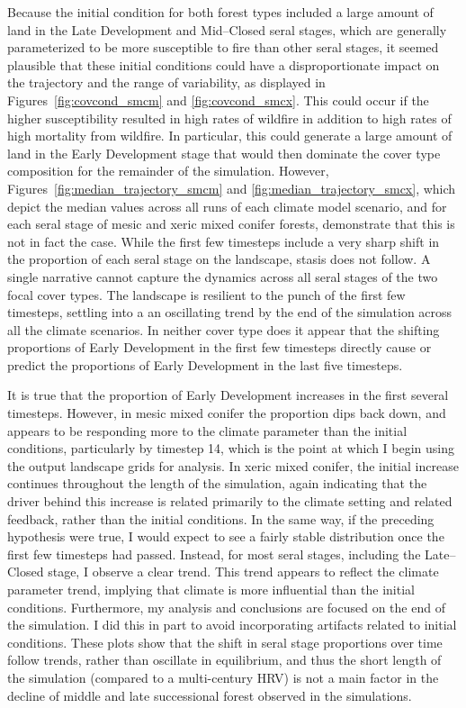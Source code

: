 Because the initial condition for both forest types included a large amount of land in the Late Development and Mid--Closed seral stages, which are generally parameterized to be more susceptible to fire than other seral stages, it seemed plausible that these initial conditions could have a disproportionate impact on the trajectory and the range of variability, as displayed in Figures~\ref{fig:covcond_smcm} and \ref{fig:covcond_smcx}. This could occur if the higher susceptibility resulted in high rates of wildfire in addition to high rates of high mortality from wildfire. In particular, this could generate a large amount of land in the Early Development stage that would then dominate the cover type composition for the remainder of the simulation. However, Figures~\ref{fig:median_trajectory_smcm} and \ref{fig:median_trajectory_smcx}, which depict the median values across all runs of each climate model scenario, and for each seral stage of mesic and xeric mixed conifer forests, demonstrate that this is not in fact the case. While the first few timesteps include a very sharp shift in the proportion of each seral stage on the landscape, stasis does not follow. A single narrative cannot capture the dynamics across all seral stages of the two focal cover types. The landscape is resilient to the punch of the first few timesteps, settling into a an oscillating trend by the end of the simulation across all the climate scenarios. In neither cover type does it appear that the shifting proportions of Early Development in the first few timesteps directly cause or predict the proportions of Early Development in the last five timesteps.

It is true that the proportion of Early Development increases in the first several timesteps. However, in mesic mixed conifer the proportion dips back down, and appears to be responding more to the climate parameter than the initial conditions, particularly by timestep 14, which is the point at which I begin using the output landscape grids for analysis. In xeric mixed conifer, the initial increase continues throughout the length of the simulation, again indicating that the driver behind this increase is related primarily to the climate setting and related feedback, rather than the initial conditions. In the same way, if the preceding hypothesis were true, I would expect to see a fairly stable distribution once the first few timesteps had passed. Instead, for most seral stages, including the Late--Closed stage, I observe a clear trend. This trend appears to reflect the climate parameter trend, implying that climate is more influential than the initial conditions. Furthermore, my analysis and conclusions are focused on the end of the simulation. I did this in part to avoid incorporating artifacts related to initial conditions. These plots show that the shift in seral stage proportions over time follow trends, rather than oscillate in equilibrium, and thus the short length of the simulation (compared to a multi-century HRV) is not a main factor in the decline of middle and late successional forest observed in the simulations.

